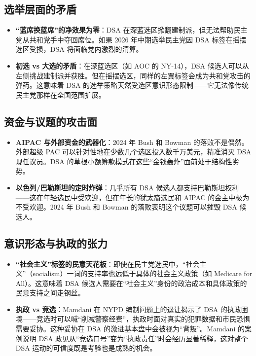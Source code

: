 \documentclass[12pt,a4paper]{ctexart}
\begin{document}
\subsection{选举层面的矛盾}

\begin{itemize}
  \item \textbf{``蓝席换蓝席''的净效果为零}：DSA 在深蓝选区掀翻建制派，但无法帮助民主党从共和党手中夺回席位。如果 2026 年中期选举民主党因 DSA 标签在摇摆选区受损，DSA 将面临党内激烈的清算。
  \item \textbf{初选 vs 大选的矛盾}：在深蓝选区（如 AOC 的 NY-14），DSA 候选人可以从左侧挑战建制派并获胜。但在摇摆选区，同样的左翼标签会成为共和党攻击的弹药。这意味着 DSA 的选举策略天然受选区意识形态限制——它无法像传统民主党那样在全国范围扩展。
\end{itemize}

\subsection{资金与议题的攻击面}

\begin{itemize}
  \item \textbf{AIPAC 与外部资金的武器化}：2024 年 Bush 和 Bowman 的落败不是偶然。外部超级 PAC 可以针对性地在少数几个选区投入数千万美元，精准消灭 DSA 现任议员。DSA 的草根小额筹款模式在这些``金钱轰炸''面前处于结构性劣势。
  \item \textbf{以色列/巴勒斯坦的定时炸弹}：几乎所有 DSA 候选人都支持巴勒斯坦权利——这在年轻选民中受欢迎，但在年长的犹太裔选民和 AIPAC 的金主中极为不受欢迎。2024 年 Bush 和 Bowman 的落败表明这个议题可以摧毁 DSA 候选人。
\end{itemize}

\subsection{意识形态与执政的张力}

\begin{itemize}
  \item \textbf{``社会主义''标签的民意天花板}：即使在民主党选民中，``社会主义''（socialism）一词的支持率也远低于具体的社会主义政策（如 Medicare for All）。这意味着 DSA 候选人需要在``社会主义''身份的政治成本和具体政策的民意支持之间走钢丝。
  \item \textbf{执政 vs 竞选}：Mamdani 在 NYPD 编制问题上的退让揭示了 DSA 的执政困境——竞选时可以喊``削减警察经费''，执政时面对真实的犯罪数据和市民恐惧需要妥协。这种妥协在 DSA 的激进基本盘中会被视为``背叛''。Mamdani 的案例说明 DSA 政见从``竞选口号''变为``执政责任''时会经历显著稀释，这对整个 DSA 运动的可信度既是考验也是成熟的机会。
\end{itemize}
\end{document}
